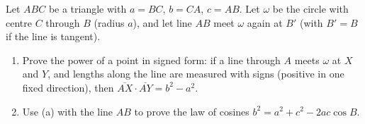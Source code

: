 Let $ABC$ be a triangle with $a=BC$, $b=CA$, $c=AB$. Let $\omega$ be the circle with centre $C$ through $B$ (radius $a$), and let line $AB$ meet $\omega$ again at $B'$ (with $B'=B$ if the line is tangent).
\begin{enumerate}
\item[(a)] Prove the power of a point in signed form: if a line through $A$ meets $\omega$ at $X$ and $Y$, and lengths along the line are measured with signs (positive in one fixed direction), then $\overline{AX}\cdot\overline{AY}=b^2-a^2$.
\item[(b)] Use (a) with the line $AB$ to prove the law of cosines $b^2=a^2+c^2-2ac\cos B$.
\end{enumerate}
